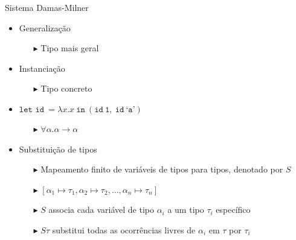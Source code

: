 \begin{frame}{Sistema Damas-Milner}
    \begin{itemize}
        \item Generalização
              \begin{itemize}
                  \item[$\blacktriangleright$] Tipo mais geral
              \end{itemize}
        \item Instanciação
              \begin{itemize}
                  \item[$\blacktriangleright$] Tipo concreto
              \end{itemize}
        \item $\texttt{let id} \ = \lambda x.x \ \texttt{in} \ (\texttt{id} \ \texttt{1}, \ \texttt{id} \ \texttt{`a'})$
              \begin{itemize}
                  \item[$\blacktriangleright$] $\forall \alpha. \alpha \rightarrow \alpha$
              \end{itemize}
        \item[]
        \item Substituição de tipos
              \begin{itemize}
                  \item[$\blacktriangleright$] Mapeamento finito de variáveis de tipos para tipos, denotado por $S$
                  \item[$\blacktriangleright$] $[ \alpha_1 \mapsto \tau_1, \alpha_2 \mapsto \tau_2, \ldots, \alpha_n \mapsto \tau_n ]$
                  \item[$\blacktriangleright$] $S$ associa cada variável de tipo $\alpha_i$ a um tipo $\tau_i$ específico
                  \item[$\blacktriangleright$] $S\tau$ substitui todas as ocorrências livres de $\alpha_i$ em $\tau$ por $\tau_i$
              \end{itemize}
    \end{itemize}
\end{frame}

